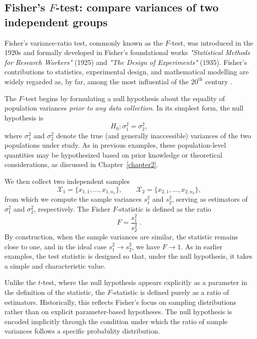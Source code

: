 \subsection{Fisher’s \(F\)-test: compare variances of two independent groups}

Fisher’s variance-ratio test, commonly known as the \(F\)-test, was introduced in the 1920s and formally developed in Fisher’s foundational works \textit{"Statistical Methods for Research Workers"} (1925) and \textit{"The Design of Experiments"} (1935). Fisher’s contributions to statistics, experimental design, and mathematical modelling are widely regarded as, by far, among the most influential of the $20^{\text{th}}$ century \cite{fisher_1924_distribution,fisher_1925_statistical,fisher_1935_design}.

\medskip

The \(F\)-test begins by formulating a null hypothesis about the equality of population variances \emph{prior to any data collection}. In its simplest form, the null hypothesis is
\[
H_0 : \sigma_1^2 = \sigma_2^2 ,
\]
where \(\sigma_1^2\) and \(\sigma_2^2\) denote the true (and generally inaccessible) variances of the two populations under study. As in previous examples, these population-level quantities may be hypothesized based on prior knowledge or theoretical considerations, as discussed in Chapter~\ref{chapter2}.

\medskip

We then collect two independent samples
\[
\mathcal{X}_1 = \{x_{1,1},\dots,x_{1,n_1}\}, \qquad
\mathcal{X}_2 = \{x_{2,1},\dots,x_{2,n_2}\},
\]
from which we compute the sample variances \(s_1^2\) and \(s_2^2\), serving as estimators of \(\sigma_1^2\) and \(\sigma_2^2\), respectively. The Fisher \(F\)-statistic is defined as the ratio
\begin{equation}
    F = \frac{s_1^2}{s_2^2} \; .
    \label{f_statistic_exact}
\end{equation}
By construction, when the sample variances are similar, the statistic remains close to one, and in the ideal case \(s_1^2 \to s_2^2\), we have \(F \to 1\). As in earlier examples, the test statistic is designed so that, under the null hypothesis, it takes a simple and characteristic value.

\medskip

Unlike the \(t\)-test, where the null hypothesis appears explicitly as a parameter in the definition of the statistic, the \(F\)-statistic is defined purely as a ratio of estimators. Historically, this reflects Fisher’s focus on sampling distributions rather than on explicit parameter-based hypotheses. The null hypothesis is encoded implicitly through the condition under which the ratio of sample variances follows a specific probability distribution.

